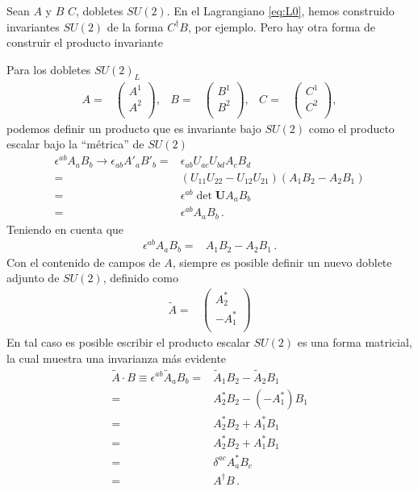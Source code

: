 \begin{frame}
Sean $A$ y $B$ $C$, dobletes $SU(2)$. En el Lagrangiano \eqref{eq:L0}, hemos construido invariantes $SU(2)$ de la forma $C^{\dagger}B$, por ejemplo. Pero hay otra forma de construir el producto invariante

Para los dobletes  $SU(2)_L$ 
\begin{align}
  A=&
  \begin{pmatrix}
    A^1\\
    A^2\\
  \end{pmatrix},&
  B=&
  \begin{pmatrix}
    B^1\\
    B^2\\
  \end{pmatrix},&
  C=&
  \begin{pmatrix}
    C^1\\
    C^2\\
  \end{pmatrix},
\end{align}
podemos definir un producto que es invariante bajo $SU(2)$ como el producto escalar bajo la ``métrica'' de $SU(2)$
\begin{align}
\epsilon^{ab}A_a B_b\to \epsilon_{ab}A'_a B'_b=&\epsilon_{ab}U_{ac}U_{bd}A_c B_d\nonumber\\
  =&\left( U_{11}U_{22}-U_{12}U_{21} \right)\left(A_1B_2-A_2B_1  \right)\nonumber\\
  =&\epsilon^{ab}\det\mathbf{U} A_a B_b\nonumber\\
  =&\epsilon^{ab} A_a B_b\,.
\end{align}
Teniendo en cuenta que
\begin{align}
  \epsilon^{ab}A_a B_b=&A_1 B_2-A_2 B_1 \,.
 \end{align}
Con el contenido de campos de $A$, siempre es posible definir un nuevo doblete adjunto de $SU(2)$, definido como 
\begin{align}
\label{eq:conjA}
 \widetilde{A}=& \begin{pmatrix}
                  A_2^{*}\\
                 -A_1^{*}\\
                \end{pmatrix}
\end{align}
En tal caso es posible escribir el producto escalar $SU(2)$ es una forma matricial, la cual muestra una invarianza más evidente
\begin{align}
\widetilde{A}\cdot B\equiv \epsilon^{ab}\widetilde{A}_a B_b=&\widetilde{A}_1 B_2-\widetilde{A}_2 B_1 \nonumber\\
                     =&A_2^{*}B_2 -(-A_1^{*}) B_1 \nonumber\\
                     =&A_2^{*}B_2 +A_1^{*} B_1 \nonumber\\
                     =&A_2^{*}B_2 +A_1^{*} B_1 \nonumber\\
                     =&\delta^{ac}A_a^{*}B_c \nonumber\\
                     =&A^{\dagger} B\,.
 \end{align}



\end{frame}
